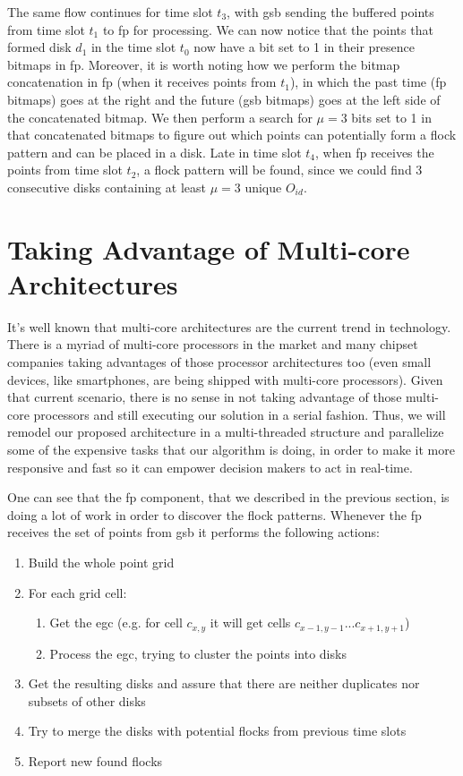 The same flow continues for time slot $t_3$, with \ac{gsb} sending the buffered points from time slot $t_1$ to \ac{fp}
for processing. We can now notice that the points that formed disk $d_1$ in the time slot $t_0$ now have a bit set to 1
in their presence bitmaps in \ac{fp}. Moreover, it is worth noting how we perform the bitmap concatenation in \ac{fp}
(when it receives points from $t_1$), in which the past time (\ac{fp} bitmaps) goes at the right and the future
(\ac{gsb} bitmaps) goes at the left side of the concatenated bitmap. We then perform a search for $\mu = 3$ bits set to
1 in that concatenated bitmaps to figure out which points can potentially form a flock pattern and can be placed in a
disk. Late in time slot $t_4$, when \ac{fp} receives the points from time slot $t_2$, a flock pattern will be found,
since we could find 3 consecutive disks containing at least $\mu = 3$ unique $O_{id}$.

\section{Taking Advantage of Multi-core Architectures}
\label{sec:multithread}
It's well known that multi-core architectures are the current trend in technology. There is a myriad of multi-core
processors in the market and many chipset companies taking advantages of those processor architectures too (even small
devices, like smartphones, are being shipped with multi-core processors). Given that current scenario, there is no sense
in not taking advantage of those multi-core processors and still executing our solution in a serial fashion. Thus, we
will remodel our proposed architecture in a multi-threaded structure and parallelize some of the expensive tasks that
our algorithm is doing, in order to make it more responsive and fast so it can empower decision makers to act in
real-time.

One can see that the \ac{fp} component, that we described in the previous section, is doing a lot of work in order to
discover the flock patterns. Whenever the \ac{fp} receives the set of points from \ac{gsb} it performs the following
actions:

\begin{enumerate}
    \item Build the whole point grid
    \item For each grid cell:
    \begin{enumerate}
        \item Get the \ac{egc} (e.g. for cell $c_{x,y}$ it will get cells $c_{x - 1, y - 1}...c_{x + 1, y+ 1}$)
        \item Process the \ac{egc}, trying to cluster the points into disks
    \end{enumerate}
    \item Get the resulting disks and assure that there are neither duplicates nor subsets of other disks
    \item Try to merge the disks with potential flocks from previous time slots
    \item Report new found flocks
\end{enumerate}

